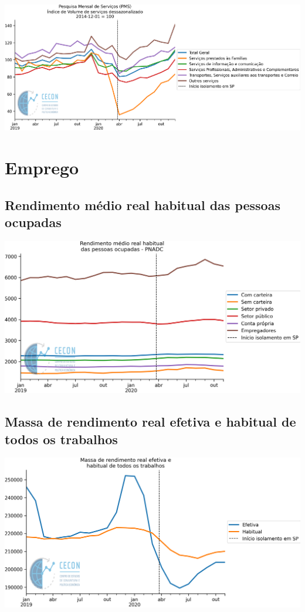 \documentclass{SelfArx}
\begin{document}
\begin{center}
\includegraphics[width=.9\linewidth]{./figs/Setoriais/PMS_IBGE.png}
\end{center}

\section*{Emprego}
\label{sec:org319ed7c}

\subsection*{Rendimento médio real habitual das pessoas ocupadas}
\label{sec:org70640b1}


\begin{center}
\includegraphics[width=.9\linewidth]{./figs/Emprego/RMHPO.png}
\end{center}

\subsection*{Massa de rendimento real efetiva e habitual de todos os trabalhos}
\label{sec:org801741c}

\begin{center}
\includegraphics[width=.9\linewidth]{./figs/Emprego/MRR_Efetiva_Habitual.png}
\end{center}
\end{document}
